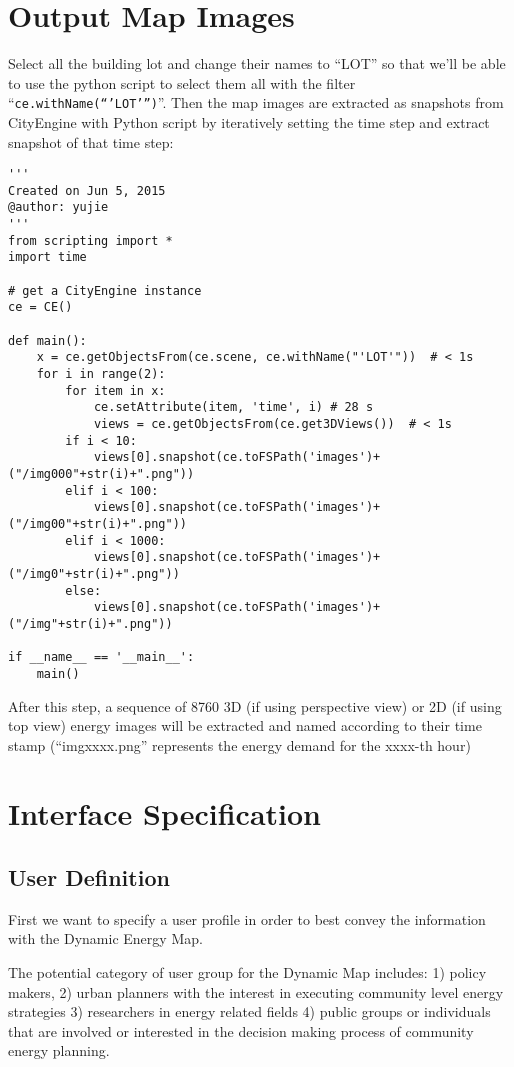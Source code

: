 \section{Output Map Images}
Select all the building lot and change their names to ``LOT'' so that
we’ll be able to use the python script to select them all with the
filter ``\texttt{ce.withName(“’LOT’”)}''. Then the map images are
extracted as snapshots from CityEngine with Python script by
iteratively setting the time step and extract snapshot of that time
step:

\makeatletter
\def\verbatim@font{\linespread{1}\tiny\ttfamily} \makeatother
\begin{verbatim}
'''
Created on Jun 5, 2015
@author: yujie
'''
from scripting import *
import time

# get a CityEngine instance
ce = CE()

def main():
    x = ce.getObjectsFrom(ce.scene, ce.withName("'LOT'"))  # < 1s
    for i in range(2):
        for item in x:
            ce.setAttribute(item, 'time', i) # 28 s
            views = ce.getObjectsFrom(ce.get3DViews())  # < 1s
        if i < 10:
            views[0].snapshot(ce.toFSPath('images')+("/img000"+str(i)+".png"))
        elif i < 100:
            views[0].snapshot(ce.toFSPath('images')+("/img00"+str(i)+".png"))
        elif i < 1000:
            views[0].snapshot(ce.toFSPath('images')+("/img0"+str(i)+".png"))
        else:
            views[0].snapshot(ce.toFSPath('images')+("/img"+str(i)+".png"))

if __name__ == '__main__':
    main()
\end{verbatim}
After this step, a sequence of 8760 3D (if using perspective view) or
2D (if using top view) energy images will be extracted and named
according to their time stamp (``imgxxxx.png'' represents the energy
demand for the xxxx-th hour)

\section{Interface Specification}\label{interfaceSpec}
\subsection{User Definition}
First we want to specify a user profile in order to best convey the
information with the Dynamic Energy Map.

The potential category of user group for the Dynamic Map includes: 1)
policy makers, 2) urban planners with the interest in executing
community level energy strategies 3) researchers in energy related
fields 4) public groups or individuals that are involved or interested
in the decision making process of community energy planning.

